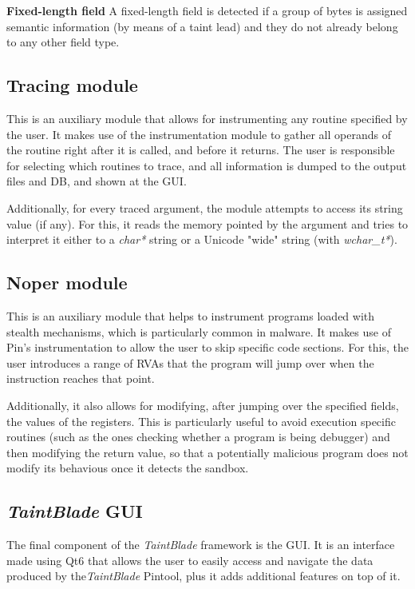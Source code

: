 \documentclass[conference]{IEEEtran}
\begin{document}
\textbf{Fixed-length field} A fixed-length field is detected if a
group of bytes is assigned semantic information (by means of
a taint lead) and they do not already belong to any other field
type.

\subsection{Tracing module}
This is an auxiliary module that allows for instrumenting any routine specified
by the user. It makes use of the instrumentation module to gather all
operands of the routine right after it is called, and before it returns.
The user is responsible for selecting which routines to trace, and all information
is dumped to the output files and DB, and shown at the GUI.

Additionally, for every traced argument, the module attempts to access its string value (if any).
For this, it reads the memory pointed by the argument and tries to
interpret it either to a \textit{char*} string or a Unicode "wide" string (with
\textit{wchar\_t*}).

\subsection{Noper module}
This is an auxiliary module that helps to instrument programs loaded with stealth
mechanisms, which is particularly common in malware. It
makes use of Pin's instrumentation to allow the user to skip specific code
sections. For this, the user introduces a range of RVAs that the program will
jump over when the instruction reaches that point.

Additionally, it also allows for modifying, after jumping over the specified
fields, the values of the registers. This is particularly useful to avoid
execution specific routines (such as the ones checking whether a program is
being debugger) and then modifying the return value, so that a potentially
malicious program does not modify its behavious once it detects the sandbox.

\subsection{\textit{TaintBlade} GUI} The final component of the \textit{TaintBlade} framework is the GUI. It is
an interface made using Qt6 that allows the user to easily access and navigate
the data produced by the\textit{TaintBlade} Pintool, plus it adds additional
features on top of it.
\end{document}
